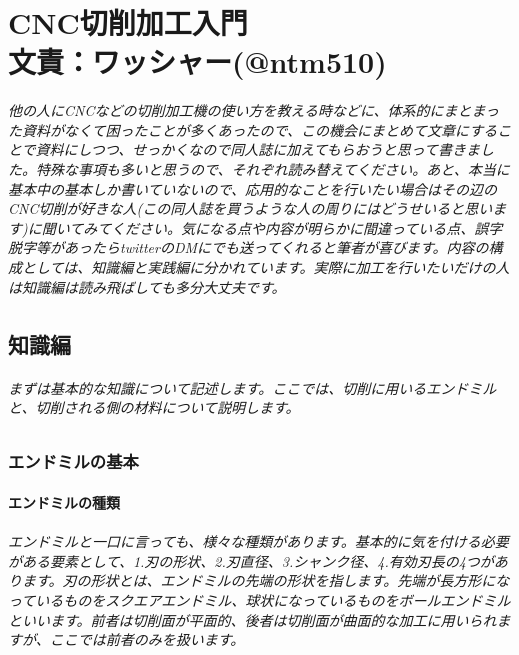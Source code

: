 \documentclass[b5paper, 9pt, twocolumn, titlepage,openany]{jsbook}%
\begin{document}
\part*{CNC切削加工入門\\文責：ワッシャー(@ntm510)}

\paragraph{他の人にCNCなどの切削加工機の使い方を教える時などに、体系的にまとまった資料がなくて困ったことが多くあったので、この機会にまとめて文章にすることで資料にしつつ、せっかくなので同人誌に加えてもらおうと思って書きました。特殊な事項も多いと思うので、それぞれ読み替えてください。あと、本当に基本中の基本しか書いていないので、応用的なことを行いたい場合はその辺のCNC切削が好きな人(この同人誌を買うような人の周りにはどうせいると思います)に聞いてみてください。気になる点や内容が明らかに間違っている点、誤字脱字等があったらtwitterのDMにでも送ってくれると筆者が喜びます。内容の構成としては、知識編と実践編に分かれています。実際に加工を行いたいだけの人は知識編は読み飛ばしても多分大丈夫です。}

\chapter{知識編}

\paragraph{まずは基本的な知識について記述します。ここでは、切削に用いるエンドミルと、切削される側の材料について説明します。}

\section{エンドミルの基本}

\subsection{エンドミルの種類}

\paragraph{エンドミルと一口に言っても、様々な種類があります。基本的に気を付ける必要がある要素として、1.刃の形状、2.刃直径、3.シャンク径、4.有効刃長の4つがあります。刃の形状とは、エンドミルの先端の形状を指します。先端が長方形になっているものをスクエアエンドミル、球状になっているものをボールエンドミルといいます。前者は切削面が平面的、後者は切削面が曲面的な加工に用いられますが、ここでは前者のみを扱います。}
\end{document}
